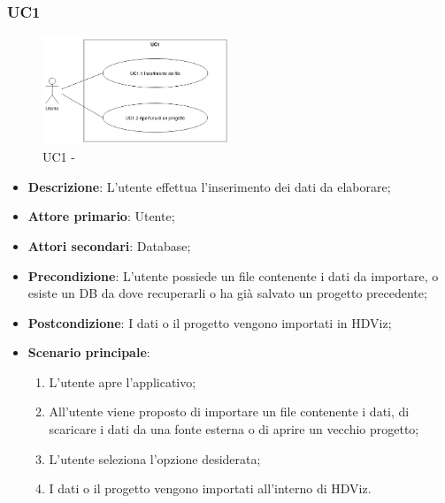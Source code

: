 \subsubsection{UC1}
\label{sub:uc1}

\begin{figure}[h]
    \centering
    \includegraphics[width=0.5\textwidth]{componenti/casi-duso/diagrammi/UC1.jpg}
    \caption{UC1 - }
    \label{fig:UC1}
\end{figure}


\begin{itemize}
    \item{\textbf{Descrizione}}: L'utente effettua l'inserimento dei dati da elaborare;
    \item{\textbf{Attore primario}}: Utente;
    \item{\textbf{Attori secondari}}: Database;
    \item{\textbf{Precondizione}}: L'utente possiede un file contenente i dati da importare, o esiste un DB da dove recuperarli o ha già salvato un progetto precedente;
    \item{\textbf{Postcondizione}}: I dati o il progetto vengono importati in HDViz;
    \item{\textbf{Scenario principale}}:
    \begin{enumerate}
        \item L'utente apre l'applicativo;
        \item All'utente viene proposto di importare un file contenente i dati, di scaricare i dati da una fonte esterna o di aprire un vecchio progetto;
        \item L'utente seleziona l'opzione desiderata;
        \item I dati o il progetto vengono importati all'interno di HDViz.
    \end{enumerate}
\end{itemize}

